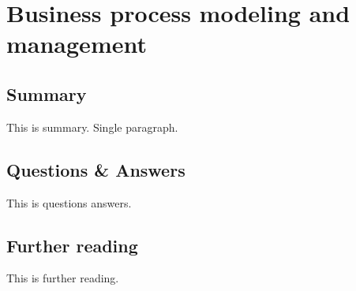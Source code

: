 \section{Business process modeling and management}

\subsection{Summary}
This is summary. Single paragraph.

\subsection{Questions \& Answers}
This is questions answers.

\subsection{Further reading}
This is further reading.
